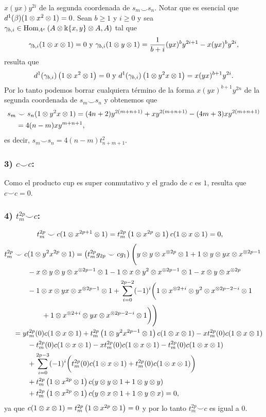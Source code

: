\documentclass[fleqn,../tesis.tex]{subfiles}
\begin{document}
$x(yx)y^{2i}$ de la segunda coordenada de $s_m \smile s_n$. Notar que es esencial que $d^1(\beta)(1\otimes x^2\otimes 1) = 0$.
Sean $b \geq  1$ y $i \geq 0$ y sea $\gamma_{b, i} \in \operatorname{Hom}_{A^e}\left(A\otimes \Bbbk\{x, y\}\otimes A, A\right)$ tal que
\[
	\gamma_{b, i}(1\otimes x \otimes 1) = 0 \text{ y }
		\gamma_{b, i}(1 \otimes y \otimes 1) = \frac{1}{b + i}(yx)^{b}y^{2i + 1} - x(yx)^{b}y^{2i},
\]
resulta que
\[
	d^1(\gamma_{b, i})\left(1\otimes x^2 \otimes 1\right) = 0
		\text{ y } d^1(\gamma_{b, i})\left(1\otimes y^2x \otimes 1\right) = x(yx)^{b + 1}y^{2i}.
\]
Por lo tanto podemos borrar cualquiera término de la forma $x(yx)^{b + 1}y^{2n}$ de la segunda coordenada
de $s_m \smile s_n$ y obtenemos que
\begin{align*}
	s_m &\smile s_n(1 \otimes y^2x\otimes 1) = (4n + 2)y^{2(m + n + 1)} + xy^{2( m + n + 1)} - (4m + 3)xy^{2(m + n + 1)}\\
	&= 4(n - m)xy^{m + n + 1},
\end{align*}
es decir, $s_m \smile s_n = 4(n - m)t_{n + m + 1}^{2}$.
\subsubsection{3) $c \smile c$:}
Como el producto cup es super conmutativo y el grado de $c$ es $1$, resulta que $c \smile c = 0$.

\subsubsection{4) $t_m^{2p} \smile c$:}
\begin{align*}
	t_m^{2p}&\smile c(1 \otimes x^{2p + 1} \otimes 1) = t_m^{2p}\left(1\otimes x^{2p} \otimes 1\right)c(1 \otimes x \otimes 1) = 0,
\end{align*}	
\begin{align*}
	t_m^{2p}&\smile c(1 \otimes y^2x^{2p} \otimes 1) = \left(t_m^{2p}g_{2p}\smile cg_1\right)
		\Bigg(y\otimes y \otimes x^{\otimes 2p} \otimes 1  + 1 \otimes y \otimes yx \otimes x^{ \otimes 2p - 1} \\
	&\qquad - x \otimes y \otimes y \otimes x^{\otimes 2p - 1} \otimes 1 - 1\otimes x \otimes y^{2} \otimes x^{\otimes 2p - 1}\otimes 1
		- x \otimes y \otimes x^{\otimes 2p}\\
	&\qquad -1 \otimes x \otimes yx \otimes x^{\otimes 2p - 1} \otimes 1
		+ \sum_{i = 0}^{2p - 2}(-1)^{i}\bigg(1\otimes x^{\otimes 2 + i} \otimes y^2 \otimes x^{\otimes 2p - 2 - i} \otimes 1\\
	&\qquad\qquad + 1 \otimes x^{\otimes 2 + i} \otimes yx \otimes x^{\otimes 2p - 2 - i} \otimes 1\bigg) \Bigg)\\
	&= yt_m^{2p}(0)c(1 \otimes x \otimes 1) + t_m^{2p}\left(1 \otimes y^2x^{2p - 1} \otimes 1\right) c(1 \otimes x \otimes 1)
		- x t_m^{2p}(0)c(1 \otimes x \otimes 1)\\	
	&\qquad - t_m^{2p}(0)c(1 \otimes x \otimes 1) -xt_m^{2p}(0)c(1 \otimes x \otimes 1) -t_m^{2p}(0)c(1 \otimes x \otimes 1)\\
	&\qquad + \sum_{i = 0}^{2p - 3}(-1)^{i}\bigg(t_m^{2p}(0)c(1 \otimes x \otimes 1) + t_m^{2p}(0)c(1 \otimes x \otimes 1)\bigg)\\
	&\qquad + t_m^{2p}\left(1 \otimes x^{2p} \otimes 1\right)c(y \otimes y \otimes 1 + 1 \otimes y \otimes y)\\
	&\qquad + t_m^{2p}\left(1 \otimes x^{2p} \otimes 1\right)c(y \otimes x \otimes 1 + 1 \otimes y \otimes x) = 0,
	\end{align*}	
ya que $c(1\otimes x \otimes 1) = t_m^{2p}\left(1 \otimes x^{2p} \otimes 1\right) = 0$ y por lo tanto
$t_m^{2p}\smile c$ es igual a $0$.
\end{document}
